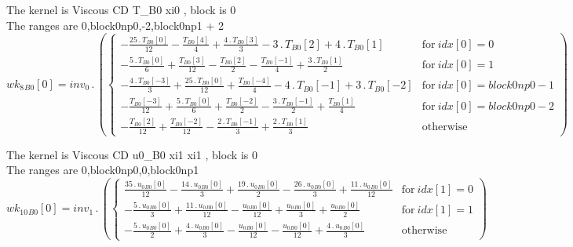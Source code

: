 \documentclass{article}
\begin{document}
\noindent The kernel is Viscous CD T_B0 xi0 , block is 0\\\noindent The ranges are 0,block0np0,-2,block0np1 + 2\\\begin{dmath}{wk_{8}{_{B0}}}[{0}] = inv_0 \,.\, \left(\begin{cases} - \frac{25 \,.\, {T{_{B0}}}[{0}]}{12} - \frac{{T{_{B0}}}[{4}]}{4} + \frac{4 \,.\, {T{_{B0}}}[{3}]}{3} - 3 \,.\, {T{_{B0}}}[{2}] + 4 \,.\, {T{_{B0}}}[{1}] & \text{for}\: {idx}[{0}] = 
0 \\- \frac{5 \,.\, {T{_{B0}}}[{0}]}{6} + \frac{{T{_{B0}}}[{3}]}{12} - \frac{{T{_{B0}}}[{2}]}{2} - \frac{{T{_{B0}}}[{-1}]}{4} + \frac{3 \,.\, {T{_{B0}}}[{1}]}{2} & \text{for}\: {idx}[{0}] = 1 \\- \frac{4 \,.\, {T{_{B0}}}[{-3}]}{3} + \frac{25 \,.\, 
{T{_{B0}}}[{0}]}{12} + \frac{{T{_{B0}}}[{-4}]}{4} - 4 \,.\, {T{_{B0}}}[{-1}] + 3 \,.\, {T{_{B0}}}[{-2}] & \text{for}\: {idx}[{0}] = block0np0 - 1 \\- \frac{{T{_{B0}}}[{-3}]}{12} + \frac{5 \,.\, {T{_{B0}}}[{0}]}{6} + \frac{{T{_{B0}}}[{-2}]}{2} - 
\frac{3 \,.\, {T{_{B0}}}[{-1}]}{2} + \frac{{T{_{B0}}}[{1}]}{4} & \text{for}\: {idx}[{0}] = block0np0 - 2 \\- \frac{{T{_{B0}}}[{2}]}{12} + \frac{{T{_{B0}}}[{-2}]}{12} - \frac{2 \,.\, {T{_{B0}}}[{-1}]}{3} + \frac{2 \,.\, {T{_{B0}}}[{1}]}{3} & 
\text{otherwise} \end{cases}\right)\end{dmath}

\noindent The kernel is Viscous CD u0_B0 xi1 xi1 , block is 0\\\noindent The ranges are 0,block0np0,0,block0np1\\\begin{dmath}{wk_{10}{_{B0}}}[{0}] = inv_1 \,.\, \left(\begin{cases} \frac{35 \,.\, {u_{0}{_{B0}}}[{0}]}{12} - \frac{14 \,.\, {u_{0}{_{B0}}}[{0}]}{3} + \frac{19 \,.\, {u_{0}{_{B0}}}[{0}]}{2} - \frac{26 \,.\, {u_{0}{_{B0}}}[{0}]}{3} + \frac{11 \,.\, 
{u_{0}{_{B0}}}[{0}]}{12} & \text{for}\: {idx}[{1}] = 0 \\- \frac{5 \,.\, {u_{0}{_{B0}}}[{0}]}{3} + \frac{11 \,.\, {u_{0}{_{B0}}}[{0}]}{12} - \frac{{u_{0}{_{B0}}}[{0}]}{12} + \frac{{u_{0}{_{B0}}}[{0}]}{3} + \frac{{u_{0}{_{B0}}}[{0}]}{2} & \text{for}\: 
{idx}[{1}] = 1 \\- \frac{5 \,.\, {u_{0}{_{B0}}}[{0}]}{2} + \frac{4 \,.\, {u_{0}{_{B0}}}[{0}]}{3} - \frac{{u_{0}{_{B0}}}[{0}]}{12} - \frac{{u_{0}{_{B0}}}[{0}]}{12} + \frac{4 \,.\, {u_{0}{_{B0}}}[{0}]}{3} & \text{otherwise} 
\end{cases}\right)\end{dmath}
\end{document}
